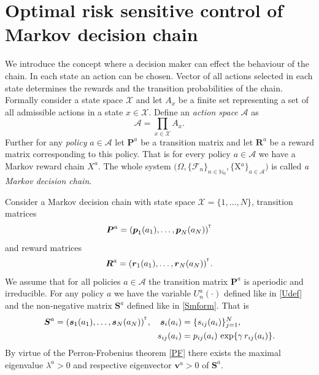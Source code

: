 \section{Optimal risk sensitive control of Markov decision chain}
\vspace{2 mm}
We introduce the concept where a decision maker can effect the behaviour of the chain. In each state an action can be chosen. Vector of all actions selected in each state determines the rewards and the transition probabilities of the chain. %
Formally consider a state space $\mathcal{X}$ and let $A_x$ be a finite set representing a set of all admissible actions in a state $x\in\mathcal{X}$. %
Define an {\em action space} $\mathcal{A}$ as
\[\mathcal{A}=\prod_{x\in\mathcal{X}}A_x.\]
Further for any {\em policy} $a\in\mathcal{A}$ let $\bm{P}^{a}$ be a transition matrix  and let $\bm{R}^{a}$ be a reward matrix corresponding to this policy. That is for every policy $a\in\mathcal{A}$ we have a Markov reward chain $X^a$. The whole system $(\Omega,\{\mathcal{F}_n\}_{n\in\mathbb{N}_0},\{$X$^a\}_{a\in\mathcal{A}})$ is called {\em a Markov decision chain}.

Consider a Markov decision chain with state space $\mathcal{X}=\{1,\dots,N\}$, transition matrices
\[\mbox{\boldmath{$P$}}^a=(\mbox{\boldmath{$p$}}_1(a_1),\dots,\mbox{\boldmath{$p$}}_N(a_N))^{^{_\texttt T}}\] 
and reward matrices
\[\mbox{\boldmath{$R$}}^a=(\mbox{\boldmath{$r$}}_1(a_1),\dots,\mbox{\boldmath{$r$}}_N(a_N))^{^{_\texttt T}}.\] 
We assume that for all policies $a\in\mathcal{A}$ the transition matrix $\bm{P}^a$ is aperiodic and irreducible. 
For any policy $a$ we have the variable $U_n^a(\cdot)$ defined like in \eqref{Udef} and the non-negative matrix $\bm{S}^{a}$ defined like in \eqref{Smform}. That is
\begin{align*}
\mbox{\boldmath{$S$}}^a=(\mbox{\boldmath{$s$}}_1(a_1),\dots,\mbox{\boldmath{$s$}}_N(a_N))^{^{_\texttt T}}, \quad \mbox{\boldmath{$s$}}_i(a_i)&=\{s_{ij}(a_i)\}_{j=1}^{N},\\
 s_{ij}(a_i)&=p_{ij}(a_i)\,\exp\{\gamma \,r_{ij}(a_i)\}.
\end{align*}
By virtue of the Perron-Frobenius theorem \ref{PF} there exists the maximal eigenvalue $\lambda^a>0$ and respective eigenvector $\bm{v}^{a}>0$ of $\bm{S}^{a}$.
 
